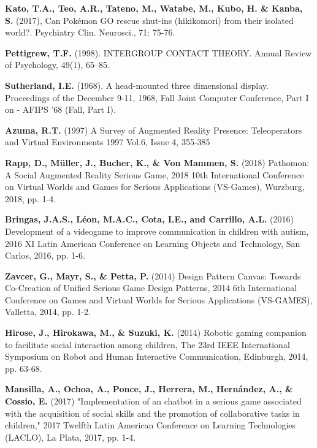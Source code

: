 \documentclass[runningheads]{llncs}
\begin{document}
\begin{thebibliography}{8}
 \textbf{Kato, T.A., Teo, A.R., Tateno, M., Watabe, M., Kubo, H. \& Kanba, S.} (2017), Can Pokémon GO rescue shut-ins (hikikomori) from their isolated world?. Psychiatry Clin. Neurosci., 71: 75-76. 

 \textbf{Pettigrew, T.F.} (1998). INTERGROUP CONTACT THEORY. Annual Review of Psychology, 49(1), 65–85. 

 \textbf{Sutherland, I.E.} (1968). A head-mounted three dimensional display. Proceedings of the December 9-11, 1968, Fall Joint Computer Conference, Part I on - AFIPS ’68 (Fall, Part I). 

 \textbf{Azuma, R.T.} (1997) A Survey of Augmented Reality
Presence: Teleoperators and Virtual Environments 1997 Vol.6, Issue 4, 355-385 

 \textbf{Rapp, D., Müller, J., Bucher, K., \& Von Mammen, S.} (2018) Pathomon: A Social Augmented Reality Serious Game, 2018 10th International Conference on Virtual Worlds and Games for Serious Applications (VS-Games), Wurzburg, 2018, pp. 1-4. 

 \textbf{Bringas, J.A.S., Léon, M.A.C., Cota, I.E., and Carrillo, A.L.} (2016) Development of a videogame to improve communication in children with autism, 2016 XI Latin American Conference on Learning Objects and Technology, San Carlos, 2016, pp. 1-6. 

 \textbf{Zavcer, G., Mayr, S., \& Petta, P.} (2014) Design Pattern Canvas: Towards Co-Creation of Unified Serious Game Design Patterns, 2014 6th International Conference on Games and Virtual Worlds for Serious Applications (VS-GAMES), Valletta, 2014, pp. 1-2.

 \textbf{Hirose, J., Hirokawa, M., \& Suzuki, K.} (2014) Robotic gaming companion to facilitate social interaction among children, The 23rd IEEE International Symposium on Robot and Human Interactive Communication, Edinburgh, 2014, pp. 63-68. 

 \textbf{Mansilla, A., Ochoa, A., Ponce, J., Herrera, M., Hernández, A., \& Cossio, E.} (2017) "Implementation of an chatbot in a serious game associated with the acquisition of social skills and the promotion of collaborative tasks in children," 2017 Twelfth Latin American Conference on Learning Technologies (LACLO), La Plata, 2017, pp. 1-4.


\end{thebibliography}
\end{document}
